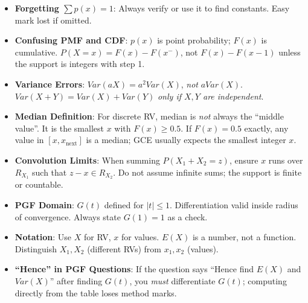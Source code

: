 \documentclass[11pt]{article}
\begin{document}
\begin{attention}
\begin{itemize}
    \item \textbf{Forgetting $\sum p(x)=1$}: Always verify or use it to find constants. Easy mark lost if omitted.
    \item \textbf{Confusing PMF and CDF}: $p(x)$ is point probability; $F(x)$ is cumulative. $P(X=x) = F(x) - F(x^-)$, not $F(x)-F(x-1)$ unless the support is integers with step 1.
    \item \textbf{Variance Errors}: $Var(aX) = a^2 Var(X)$, \emph{not} $a Var(X)$. $Var(X+Y) = Var(X)+Var(Y)$ \emph{only if $X,Y$ are independent}.
    \item \textbf{Median Definition}: For discrete RV, median is \emph{not} always the ``middle value''. It is the smallest $x$ with $F(x) \ge 0.5$. If $F(x)=0.5$ exactly, any value in $[x, x_{\text{next}}]$ is a median; GCE usually expects the smallest integer $x$.
    \item \textbf{Convolution Limits}: When summing $P(X_1+X_2=z)$, ensure $x$ runs over $R_{X_1}$ such that $z-x \in R_{X_2}$. Do not assume infinite sums; the support is finite or countable.
    \item \textbf{PGF Domain}: $G(t)$ defined for $|t|\le 1$. Differentiation valid inside radius of convergence. Always state $G(1)=1$ as a check.
    \item \textbf{Notation}: Use $X$ for RV, $x$ for values. $E(X)$ is a number, not a function. Distinguish $X_1, X_2$ (different RVs) from $x_1, x_2$ (values).
    \item \textbf{``Hence'' in PGF Questions}: If the question says ``Hence find $E(X)$ and $Var(X)$'' after finding $G(t)$, you \emph{must} differentiate $G(t)$; computing directly from the table loses method marks.
\end{itemize}
\end{attention}
\end{document}
